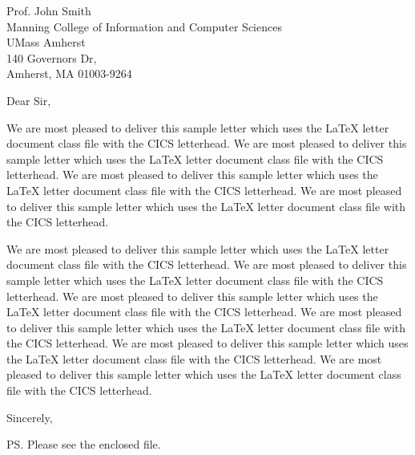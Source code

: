 \documentclass[11pt]{cicsletter}
\date{August 1, 2018} %
\begin{document}
\begin{letter}{Prof. John Smith\\ 
               Manning College of Information and Computer Sciences\\ 
               UMass Amherst\\
               140 Governors Dr, \\
               Amherst, MA 01003-9264}

\opening{Dear Sir,}

We are most pleased to deliver this sample letter which uses
the \LaTeX{} letter document class file with the CICS letterhead.
We are most pleased to deliver this sample letter which uses
the \LaTeX{} letter document class file with the CICS letterhead.
We are most pleased to deliver this sample letter which uses
the \LaTeX{} letter document class file with the CICS letterhead.
We are most pleased to deliver this sample letter which uses
the \LaTeX{} letter document class file with the CICS letterhead.




We are most pleased to deliver this sample letter which uses
the \LaTeX{} letter document class file with the CICS letterhead.
We are most pleased to deliver this sample letter which uses
the \LaTeX{} letter document class file with the CICS letterhead.
We are most pleased to deliver this sample letter which uses
the \LaTeX{} letter document class file with the CICS letterhead.
We are most pleased to deliver this sample letter which uses
the \LaTeX{} letter document class file with the CICS letterhead.
We are most pleased to deliver this sample letter which uses
the \LaTeX{} letter document class file with the CICS letterhead.
We are most pleased to deliver this sample letter which uses
the \LaTeX{} letter document class file with the CICS letterhead.

\closing{Sincerely,}


\ps{Please see the enclosed file.}


\end{letter}
\end{document}
